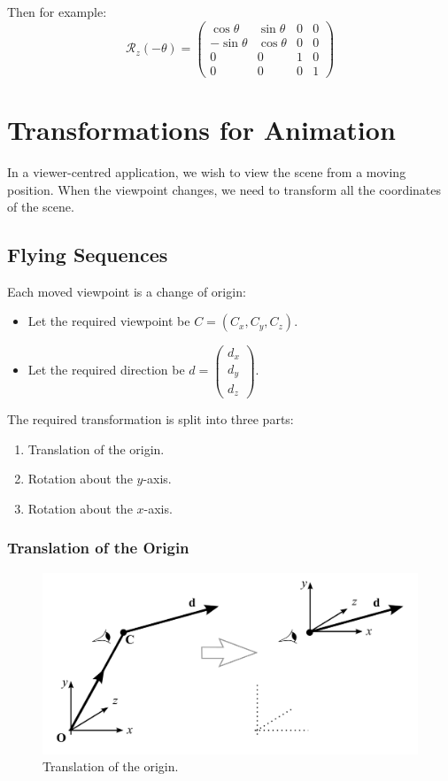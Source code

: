 \documentclass[11pt]{article}
\begin{document}
Then for example:
\[
  \mathcal{R}_z(-\theta) = 
  \begin{pmatrix}
    \cos \theta & \sin \theta & 0 & 0 \\
    - \sin \theta & \cos \theta & 0 & 0 \\
    0 & 0 & 1 & 0 \\
    0 & 0 & 0 & 1
  \end{pmatrix}
\]

\section{Transformations for Animation}
In a viewer-centred application, we wish to view the scene from a moving position.
When the viewpoint changes, we need to transform all the coordinates of the scene.

\subsection{Flying Sequences}
Each moved viewpoint is a change of origin:
\begin{itemize}
  \item Let the required viewpoint be $C = (C_x, C_y, C_z)$.
  \item Let the required direction be $d = \begin{pmatrix} d_x \\ d_y \\ d_z \end{pmatrix}$.
\end{itemize}

The required transformation is split into three parts:
\begin{enumerate}
  \item Translation of the origin.
  \item Rotation about the $y$-axis.
  \item Rotation about the $x$-axis.
\end{enumerate}

\subsubsection{Translation of the Origin}

\begin{figure}[htb!]
  \caption{Translation of the origin.}
  \includegraphics[scale=0.2]{transorigin}
  \centering
\end{figure}
\end{document}
